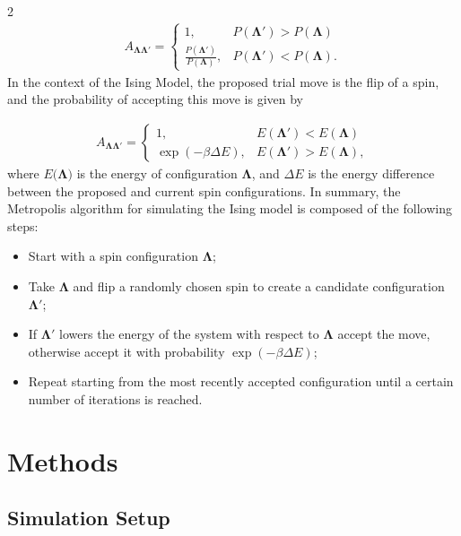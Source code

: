 \documentclass{article}
\begin{document}
\begin{multicols}{2}
\begin{align}
    A_{\boldsymbol{\Lambda}\boldsymbol{\Lambda}'} = 
    \begin{cases}
        1, &P(\boldsymbol{\Lambda}')>P(\boldsymbol{\Lambda})\\
        \frac{P(\boldsymbol{\Lambda}')}{P(\boldsymbol{\Lambda})}, &P(\boldsymbol{\Lambda}')<P(\boldsymbol{\Lambda}).
    \end{cases}
\end{align}
%
In the context of the Ising Model, the proposed trial move is the flip of a spin, and the probability of accepting this move is given by

\begin{align}
    A_{\boldsymbol{\Lambda}\boldsymbol{\Lambda}'} = 
    \begin{cases}
        1, &E(\boldsymbol{\Lambda}')<E(\boldsymbol{\Lambda})\\
        \exp(-\beta\Delta E), &E(\boldsymbol{\Lambda}')>E(\boldsymbol{\Lambda}),
    \end{cases}
    \label{rule}
\end{align}
%
where $E(\boldsymbol{\Lambda)}$ is the energy of configuration $\boldsymbol{\Lambda}$, and $\Delta E$ is the energy difference between the proposed and current spin configurations. In summary, the Metropolis algorithm for simulating the Ising model is composed of the following steps:

\begin{itemize}
    \item[I] Start with a spin configuration $\boldsymbol{\Lambda}$;
    \item[II] Take $\boldsymbol{\Lambda}$ and flip a randomly chosen spin to create a candidate configuration $\boldsymbol{\Lambda}'$;
    \item[III] If $\boldsymbol{\Lambda}'$ lowers the energy of the system with respect to $\boldsymbol{\Lambda}$ accept the move, otherwise accept it with probability $\exp(-\beta\Delta E)$;
    \item[IV] Repeat starting from the most recently accepted configuration until a certain number of iterations is reached.
\end{itemize}

\section{Methods}

\subsection{Simulation Setup}


\end{multicols}
\end{document}
